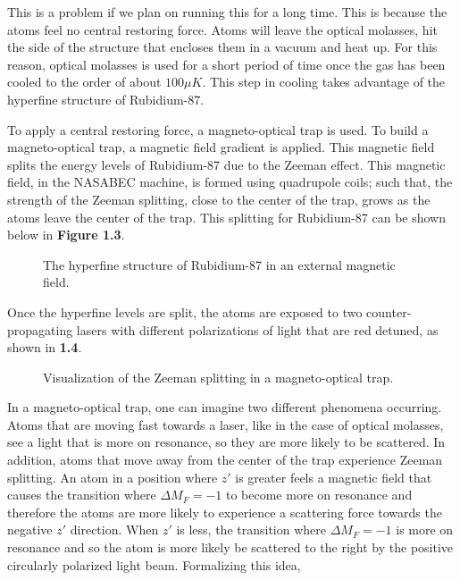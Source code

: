 This is a problem if we plan on running this for a long time. This is because the atoms feel no central restoring force. Atoms will leave the optical molasses, hit the side of the structure that encloses them in a vacuum and heat up. For this reason, optical molasses is used for a short period of time once the gas has been cooled to the order of about $100\mu K$. This step in cooling takes advantage of the hyperfine structure of Rubidium-87. \cite{foot}\cite{metcalf_article}\cite{LCandT}

To apply a central restoring force, a magneto-optical trap is used. To build a magneto-optical trap, a magnetic field gradient is applied. This magnetic field splits the energy levels of Rubidium-87 due to the Zeeman effect. This magnetic field, in the NASABEC machine, is formed using quadrupole coils; such that, the strength of the Zeeman splitting, close to the center of the trap, grows as the atoms leave the center of the trap. This splitting for Rubidium-87 can be shown below in \textbf{Figure 1.3}.

\begin{figure}[h!]
\begin{center}
\end{center}
\caption{The hyperfine structure of Rubidium-87 in an external magnetic field. \cite{steck} }
\end{figure}

Once the hyperfine levels are split, the atoms are exposed to two counter-propagating lasers with different polarizations of light that are red detuned, as shown in \textbf{1.4}. 

\begin{figure}[h!]
\begin{center}
\end{center}
\caption{Visualization of the Zeeman splitting in a magneto-optical trap.   \cite{steck} }
\end{figure}

In a magneto-optical trap, one can imagine two different phenomena occurring. Atoms that are moving fast towards a laser, like in the case of optical molasses, see a light that is more on resonance, so they are more likely to be scattered. In addition, atoms that move away from the center of the trap experience Zeeman splitting. An atom in a position where $z'$ is greater feels a magnetic field that causes the transition where $\Delta M_F = -1$ to become more on resonance and therefore the atoms are more likely to experience a scattering force towards the negative $z'$ direction. When $z'$ is less, the transition where $\Delta M_F = -1$ is more on resonance and so the atom is more likely be scattered to the right by the positive circularly polarized light beam. Formalizing this idea,\cite{foot}

